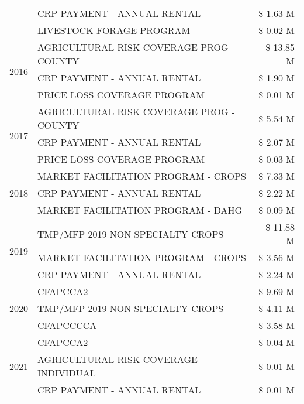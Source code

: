 \begin{tabular}{llr}
 & CRP PAYMENT - ANNUAL RENTAL & \$ 1.63 M \\
 & LIVESTOCK FORAGE PROGRAM & \$ 0.02 M \\
\cline{1-3}
\multirow[t]{3}{*}{2016} & AGRICULTURAL RISK COVERAGE PROG - COUNTY & \$ 13.85 M \\
 & CRP PAYMENT - ANNUAL RENTAL & \$ 1.90 M \\
 & PRICE LOSS COVERAGE PROGRAM & \$ 0.01 M \\
\cline{1-3}
\multirow[t]{3}{*}{2017} & AGRICULTURAL RISK COVERAGE PROG - COUNTY & \$ 5.54 M \\
 & CRP PAYMENT - ANNUAL RENTAL & \$ 2.07 M \\
 & PRICE LOSS COVERAGE PROGRAM & \$ 0.03 M \\
\cline{1-3}
\multirow[t]{3}{*}{2018} & MARKET FACILITATION PROGRAM - CROPS & \$ 7.33 M \\
 & CRP PAYMENT - ANNUAL RENTAL & \$ 2.22 M \\
 & MARKET FACILITATION PROGRAM - DAHG & \$ 0.09 M \\
\cline{1-3}
\multirow[t]{3}{*}{2019} & TMP/MFP 2019 NON SPECIALTY CROPS & \$ 11.88 M \\
 & MARKET FACILITATION PROGRAM - CROPS & \$ 3.56 M \\
 & CRP PAYMENT - ANNUAL RENTAL & \$ 2.24 M \\
\cline{1-3}
\multirow[t]{3}{*}{2020} & CFAPCCA2 & \$ 9.69 M \\
 & TMP/MFP 2019 NON SPECIALTY CROPS & \$ 4.11 M \\
 & CFAPCCCCA & \$ 3.58 M \\
\cline{1-3}
\multirow[t]{3}{*}{2021} & CFAPCCA2 & \$ 0.04 M \\
 & AGRICULTURAL RISK COVERAGE - INDIVIDUAL & \$ 0.01 M \\
 & CRP PAYMENT - ANNUAL RENTAL & \$ 0.01 M \\
\cline{1-3}
\bottomrule
\end{tabular}
